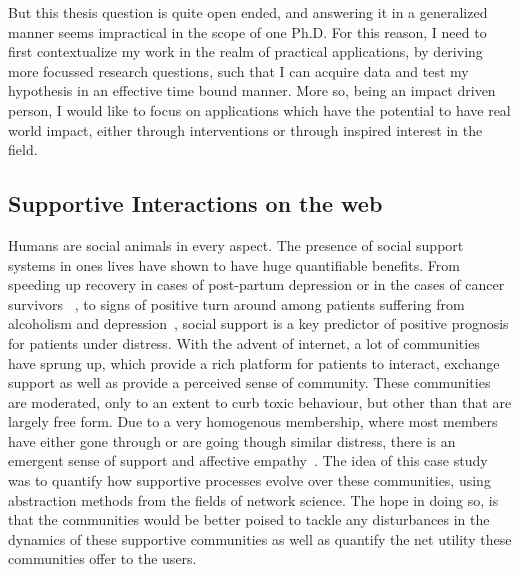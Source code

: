 \vspace{1cm}
\noindent{}
\vspace{1cm} 

But this thesis question is quite open ended, and answering it in a generalized manner seems impractical in the scope of one Ph.D. For this reason, I need to first contextualize my work in the realm  of practical applications, by deriving more focussed research questions, such that I can acquire data and test my hypothesis in an effective time bound manner. More so, being an impact driven person, I would like to focus on applications which have the potential to have real world impact, either through interventions or through inspired interest in the field.

\subsection{Supportive Interactions on the web}
Humans are social animals in every aspect. The presence of social support systems in ones lives have shown to have huge quantifiable benefits. From speeding up recovery in cases of post-partum depression or in the cases of cancer survivors~\cite{collins1993social,dunkel1984social,baron1990social} , to signs of positive turn around among patients suffering from alcoholism and depression~\cite{peirce2000longitudinal,brown1986social}, social support is a key predictor of positive prognosis for patients under distress. With the advent of internet, a lot of communities have sprung up, which provide a rich platform for patients to interact, exchange support as well as provide a perceived sense of community. These communities are moderated, only to an extent to curb toxic behaviour, but other than that are largely free form. Due to a very homogenous membership, where most members have either gone through or are going though similar distress, there is an emergent sense of support and affective empathy~\cite{de2016stroke}. The idea of this case study was to quantify how supportive processes evolve over these communities, using abstraction methods from the fields of network science. The hope in doing so, is that the communities would be better poised to tackle any disturbances in the dynamics of these supportive communities as well as quantify the net utility these communities offer to the users. 

